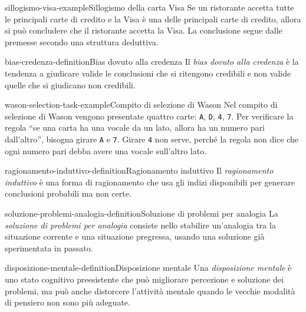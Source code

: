 \documentclass[preview]{standalone}
\begin{document}
\begin{snippetexample}{sillogismo-visa-example}{Sillogismo della carta Visa}
    Se un ristorante accetta tutte le principali carte di credito e la Visa è
    una delle principali carte di credito, allora si può concludere che il
    ristorante accetta la Visa. La conclusione segue dalle premesse secondo una
    struttura deduttiva.
\end{snippetexample}

\begin{snippetdefinition}{bias-credenza-definition}{Bias dovuto alla credenza}
    Il \emph{bias dovuto alla credenza} è la tendenza a giudicare valide le
    conclusioni che si ritengono credibili e non valide quelle che si giudicano
    non credibili.
\end{snippetdefinition}

\begin{snippetexample}{wason-selection-task-example}{Compito di selezione di Wason}
    Nel compito di selezione di Wason vengono presentate quattro carte:
    \texttt{A}, \texttt{D}, \texttt{4}, \texttt{7}. Per verificare la regola
    ``se una carta ha una vocale da un lato, allora ha un numero pari
    dall'altro'', bisogna girare \texttt{A} e \texttt{7}. Girare \texttt{4} non
    serve, perché la regola non dice che ogni numero pari debba avere una vocale
    sull'altro lato.
\end{snippetexample}


\begin{snippetdefinition}{ragionamento-induttivo-definition}{Ragionamento induttivo}
    Il \emph{ragionamento induttivo} è una forma di ragionamento che usa gli
    indizi disponibili per generare conclusioni probabili ma non certe.
\end{snippetdefinition}

\begin{snippetdefinition}{soluzione-problemi-analogia-definition}{Soluzione di problemi per analogia}
    La \emph{soluzione di problemi per analogia} consiste nello stabilire
    un'analogia tra la situazione corrente e una situazione pregressa, usando una
    soluzione già sperimentata in passato.
\end{snippetdefinition}

\begin{snippetdefinition}{disposizione-mentale-definition}{Disposizione mentale}
    Una \emph{disposizione mentale} è uno stato cognitivo preesistente che può
    migliorare percezione e soluzione dei problemi, ma può anche distorcere
    l'attività mentale quando le vecchie modalità di pensiero non sono più
    adeguate.
\end{snippetdefinition}
\end{document}
